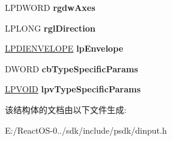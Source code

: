 \begin{DoxyCompactItemize}
\mbox{\label{struct_d_i_e_f_f_e_c_t___d_x5_a141a8f82ab8514d401a3c46d77e2f61f}} 
L\+P\+D\+W\+O\+RD {\bfseries rgdw\+Axes}
\item 
\mbox{\label{struct_d_i_e_f_f_e_c_t___d_x5_ac19b69a1b9fdf60d3d3c359b33e7b7a7}} 
L\+P\+L\+O\+NG {\bfseries rgl\+Direction}
\item 
\mbox{\label{struct_d_i_e_f_f_e_c_t___d_x5_ab9f3a02992b907073831f93b6e55fae3}} 
\hyperlink{struct_d_i_e_n_v_e_l_o_p_e}{L\+P\+D\+I\+E\+N\+V\+E\+L\+O\+PE} {\bfseries lp\+Envelope}
\item 
\mbox{\label{struct_d_i_e_f_f_e_c_t___d_x5_a4bff6ac202069c80396955e7a4244ca2}} 
D\+W\+O\+RD {\bfseries cb\+Type\+Specific\+Params}
\item 
\mbox{\label{struct_d_i_e_f_f_e_c_t___d_x5_a6fb296f4567fc5724f77c4fed5ba983e}} 
\hyperlink{interfacevoid}{L\+P\+V\+O\+ID} {\bfseries lpv\+Type\+Specific\+Params}
\end{DoxyCompactItemize}


该结构体的文档由以下文件生成\+:\begin{DoxyCompactItemize}
\item 
E\+:/\+React\+O\+S-\/0../sdk/include/psdk/dinput.\+h\end{DoxyCompactItemize}
